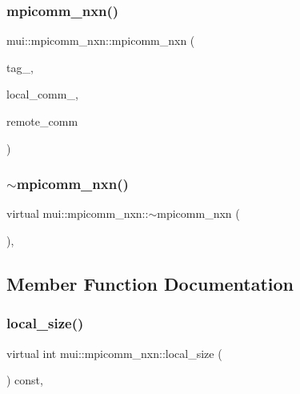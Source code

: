 \subsubsection{\texorpdfstring{mpicomm\+\_\+nxn()}{mpicomm\_nxn()}}
{\footnotesize\ttfamily mui\+::mpicomm\+\_\+nxn\+::mpicomm\+\_\+nxn (\begin{DoxyParamCaption}\item[{int}]{tag\+\_\+,  }\item[{M\+P\+I\+\_\+\+Comm}]{local\+\_\+comm\+\_\+,  }\item[{M\+P\+I\+\_\+\+Comm}]{remote\+\_\+comm }\end{DoxyParamCaption})\hspace{0.3cm}{\ttfamily [inline]}}

\mbox{\label{classmui_1_1mpicomm__nxn_a7fe76b7f261054474e5b63e24248c1ab}} 
\subsubsection{\texorpdfstring{$\sim$mpicomm\+\_\+nxn()}{~mpicomm\_nxn()}}
{\footnotesize\ttfamily virtual mui\+::mpicomm\+\_\+nxn\+::$\sim$mpicomm\+\_\+nxn (\begin{DoxyParamCaption}{ }\end{DoxyParamCaption})\hspace{0.3cm}{\ttfamily [inline]}, {\ttfamily [virtual]}}



\subsection{Member Function Documentation}
\mbox{\label{classmui_1_1mpicomm__nxn_aa30777638394ee6f17851f06c7793454}} 
\subsubsection{\texorpdfstring{local\+\_\+size()}{local\_size()}}
{\footnotesize\ttfamily virtual int mui\+::mpicomm\+\_\+nxn\+::local\+\_\+size (\begin{DoxyParamCaption}{ }\end{DoxyParamCaption}) const\hspace{0.3cm}{\ttfamily [inline]}, {\ttfamily [virtual]}}



